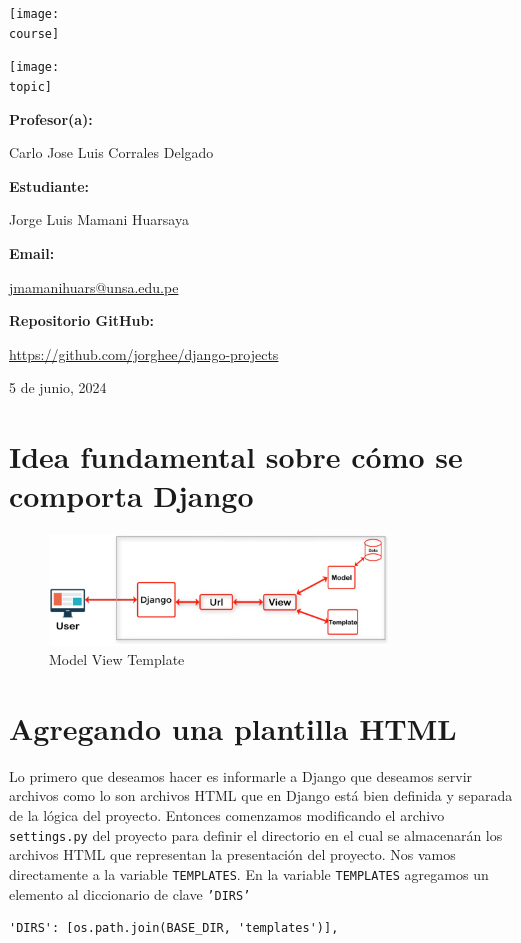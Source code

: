 \documentclass[10pt, a4paper]{article}
\makeatletter
\newcommand{\mpy}[1]{\texttt{#1}}
\newcommand{\course}{img/web_programming.png}
\newcommand{\topic}{img/django_templates.png}
\newcommand{\professor}{Carlo Jose Luis Corrales Delgado}
\newcommand{\student}{Jorge Luis Mamani Huarsaya}
\newcommand{\email}{https://mail.google.com/mail/u/0/?fs=1&tf=cm&source=mailto&to=jmamanihuars@unsa.edu.pe}
\newcommand{\github}{https://github.com/jorghee/django-projects}
\newcommand{\mydate}{5 de junio, 2024}
\makeatother
\begin{document}
\begin{titlepage}
	\centering
	\texttt{[image: \\course]} \par
  \vfill \vfill
	\texttt{[image: \\topic]}\par
  \vfill \vfill
  {\textbf{Profesor(a):} \par}
	\professor \vfill
  {\textbf{Estudiante:} \par}
	\student \vfill
  {\textbf{Email:} \par}
  \href{\email}{jmamanihuars@unsa.edu.pe} \vfill
  {\textbf{Repositorio GitHub:} \par}
  \href{\github}{\github} \vfill
	{\large \mydate \par}
\end{titlepage}

\section{Idea fundamental sobre cómo se comporta Django}
\begin{figure}[H]
  \centering
  \includegraphics[width=0.8\textwidth]{img/model_view_template.png}
  \caption{Model View Template}
\end{figure}

\section{Agregando una plantilla HTML}
Lo primero que deseamos hacer es informarle a Django que deseamos servir archivos como lo son archivos HTML que en Django está bien definida y separada de la lógica del proyecto. Entonces comenzamos modificando el archivo \mpy{settings.py} del proyecto para definir el directorio en el cual se almacenarán los archivos HTML que representan la presentación del proyecto. Nos vamos directamente a la variable \mpy{TEMPLATES}.
\singlespacing
En la variable \mpy{TEMPLATES} agregamos un elemento al diccionario de clave \mpy{'DIRS'}

\begin{verbatim}
'DIRS': [os.path.join(BASE_DIR, 'templates')],
\end{verbatim}
\end{document}
